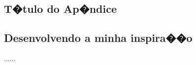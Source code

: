 \begin{center}
\chapter{T�tulo do Ap�ndice} %
\end{center}

\section{Desenvolvendo a minha inspira��o} 

......
